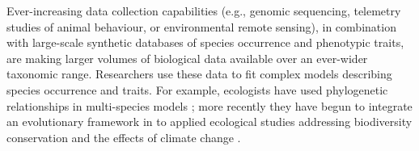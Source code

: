 \documentclass[12pt]{article}
\begin{document}
Ever-increasing data collection capabilities (e.g., genomic sequencing, telemetry studies of animal behaviour, or environmental remote sensing), in combination with large-scale synthetic databases of species occurrence and phenotypic traits, are making larger volumes of biological data available over an ever-wider taxonomic range.
Researchers use these data to fit complex models describing species occurrence and traits.
For example, ecologists have used phylogenetic relationships in multi-species models \citep{garland1992procedures, freckleton2002phylogenetic, ord2010adaptation, davies2013phylogenetic}; more recently they have begun to integrate an evolutionary framework in to applied ecological studies addressing biodiversity conservation and the effects of climate change \citep{winter2013phylogenetic, santamaria2012evolution, lankau2011incorporating, lavergne2010biodiversity, mace2008evolutionary}.
\end{document}
